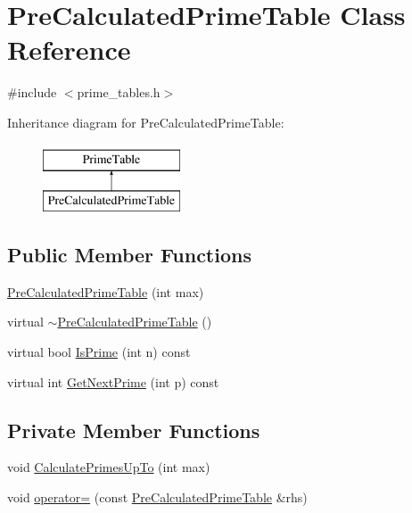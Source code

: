 \hypertarget{classPreCalculatedPrimeTable}{\section{\-Pre\-Calculated\-Prime\-Table \-Class \-Reference}
\label{d0/d98/classPreCalculatedPrimeTable}
}


{\ttfamily \#include $<$prime\-\_\-tables.\-h$>$}

\-Inheritance diagram for \-Pre\-Calculated\-Prime\-Table\-:\begin{figure}[H]
\begin{center}
\leavevmode
\includegraphics[height=2.000000cm]{d0/d98/classPreCalculatedPrimeTable}
\end{center}
\end{figure}
\subsection*{\-Public \-Member \-Functions}
\begin{DoxyCompactItemize}
\item 
\hyperlink{classPreCalculatedPrimeTable_a29c87e283e38c38fd3b570914e06323f}{\-Pre\-Calculated\-Prime\-Table} (int max)
\item 
virtual \hyperlink{classPreCalculatedPrimeTable_a9040dc9624dad5cee68511bac8b89685}{$\sim$\-Pre\-Calculated\-Prime\-Table} ()
\item 
virtual bool \hyperlink{classPreCalculatedPrimeTable_a8511f4f0202c5e13abf58e386aee2b20}{\-Is\-Prime} (int n) const 
\item 
virtual int \hyperlink{classPreCalculatedPrimeTable_a35b8e0007e98997525a14c34a6632be3}{\-Get\-Next\-Prime} (int p) const 
\end{DoxyCompactItemize}
\subsection*{\-Private \-Member \-Functions}
\begin{DoxyCompactItemize}
\item 
void \hyperlink{classPreCalculatedPrimeTable_aee4610d45bea776afd5de3998df58e8d}{\-Calculate\-Primes\-Up\-To} (int max)
\item 
void \hyperlink{classPreCalculatedPrimeTable_afb3106e0f5389ace664592d74bf481fd}{operator=} (const \hyperlink{classPreCalculatedPrimeTable}{\-Pre\-Calculated\-Prime\-Table} \&rhs)
\end{DoxyCompactItemize}
